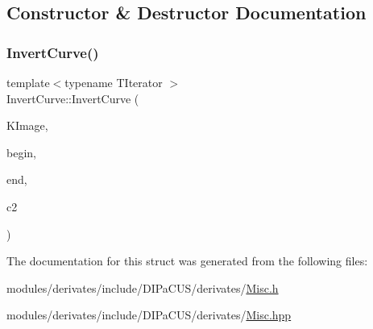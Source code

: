 \subsection{Constructor \& Destructor Documentation}
\mbox{\label{structDIPaCUS_1_1Misc_1_1InvertCurve_a551b582c8c9abf2f86937a7c7468491e}} 
\subsubsection{\texorpdfstring{Invert\+Curve()}{InvertCurve()}}
{\footnotesize\ttfamily template$<$typename T\+Iterator $>$ \\
Invert\+Curve\+::\+Invert\+Curve (\begin{DoxyParamCaption}\item[{const \hyperlink{structDIPaCUS_1_1Misc_1_1InvertCurve_a64773d7b4da91e66b4cc83112d4aa1d1}{K\+Space} \&}]{K\+Image,  }\item[{T\+Iterator}]{begin,  }\item[{T\+Iterator}]{end,  }\item[{\hyperlink{structDIPaCUS_1_1Misc_1_1InvertCurve_a4a338524a4f9be41169d6eeb519c6a20}{Curve} \&}]{c2 }\end{DoxyParamCaption})}



The documentation for this struct was generated from the following files\+:\begin{DoxyCompactItemize}
\item 
modules/derivates/include/\+D\+I\+Pa\+C\+U\+S/derivates/\hyperlink{Misc_8h}{Misc.\+h}\item 
modules/derivates/include/\+D\+I\+Pa\+C\+U\+S/derivates/\hyperlink{Misc_8hpp}{Misc.\+hpp}\end{DoxyCompactItemize}
